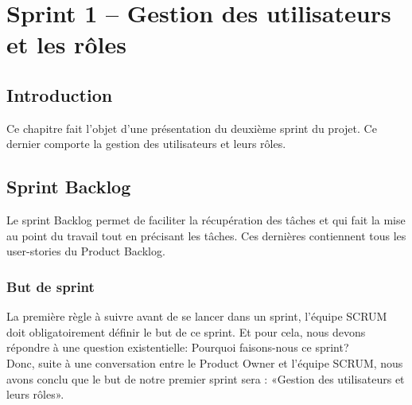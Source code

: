 \chapter{Sprint 1 – Gestion des utilisateurs et les rôles}
	
\section*{Introduction}
Ce chapitre fait l’objet d’une présentation du deuxième sprint du projet. Ce dernier comporte la gestion des utilisateurs et leurs rôles.

\section[Sprint Backlog]{Sprint Backlog}
Le sprint Backlog permet de faciliter la récupération des tâches et qui fait la mise au point du travail tout en précisant les tâches. Ces dernières contiennent tous les user-stories du Product Backlog.
\subsection[But de sprint]{But de sprint}
La première règle à suivre avant de se lancer dans un sprint, l’équipe SCRUM doit obligatoirement définir le but de ce sprint. Et pour cela, nous devons répondre à une question existentielle: Pourquoi faisons-nous ce sprint?\\
Donc, suite à une conversation entre le Product Owner et l’équipe SCRUM, nous avons conclu que le but de notre premier sprint sera : «Gestion des utilisateurs et leurs rôles».
